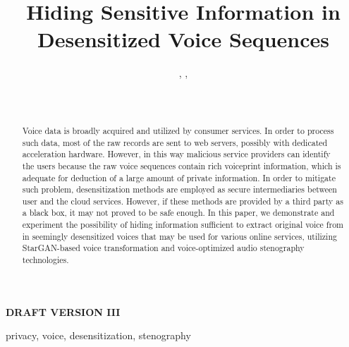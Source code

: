 \documentclass[journal]{IEEEtran} %
\begin{document}
\title{Hiding Sensitive Information in Desensitized Voice Sequences}

\author{%
    , %
    , %
    \\%
    \\%
    \\%
}

\maketitle

\textbf{DRAFT VERSION III}

\begin{abstract}
Voice data is broadly acquired and utilized by consumer services. In order to process such data, most of the raw records are sent to web servers, possibly with dedicated acceleration hardware. However, in this way malicious service providers can identify the users because the raw voice sequences contain rich voiceprint information, which is adequate for deduction of a large amount of private information. In order to mitigate such problem, desensitization methods are employed as secure intermediaries between user and the cloud services. However, if these methods are provided by a third party as a black box, it may not proved to be safe enough. In this paper, we demonstrate and experiment the possibility of hiding information sufficient to extract original voice from in seemingly desensitized voices that may be used for various online services, utilizing StarGAN-based voice transformation and voice-optimized audio stenography technologies.
\end{abstract}

\begin{IEEEkeywords}
    privacy, voice, desensitization, stenography
\end{IEEEkeywords}
\end{document}
